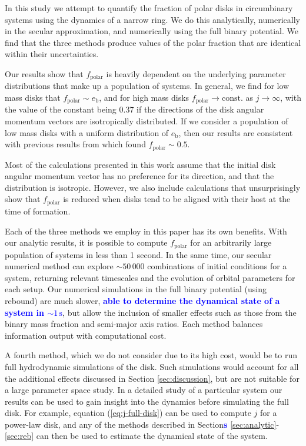 \documentclass[twocolumn,linenumbers]{aastex631}
\newcommand{\RR}[1]{\textcolor{blue}{\bf#1}} %
\begin{document}
In this study we attempt to quantify the fraction of polar disks in circumbinary systems using the dynamics of a narrow ring. We do this analytically, numerically in the secular approximation, and numerically using the full binary potential. We find that the three methods produce values of the polar fraction that are identical within their uncertainties.

Our results show that $f_\text{polar}$ is heavily dependent on the underlying parameter distributions that make up a population of systems. In general, we find for low mass disks that $f_\text{polar} \sim e_\text{b}$, and for high mass disks $f_\text{polar} \rightarrow \text{const.}$ as $j\rightarrow \infty$, with the value of the constant being 0.37 if the directions of the disk angular momentum vectors are isotropically distributed.
If we consider a population of low mass disks with a uniform distribution of $e_\text{b}$, then our results are consistent with previous results from \citet{ceppi2024} which found $f_\text{polar}\sim 0.5$. 

Most of the calculations presented in this work assume that the initial disk angular momentum vector has no preference for its direction, and that the distribution is isotropic. However, we also include calculations that unsurprisingly show that $f_\text{polar}$ is reduced when disks tend to be aligned with their host at the time of formation.

Each of the three methods we employ in this paper has its own benefits. With our analytic results, it is possible to compute $f_\text{polar}$ for an arbitrarily large population of systems in less than 1 second. In the same time, our secular numerical method can explore $\sim 50\,000$ combinations of initial conditions for a system, returning relevant timescales and the evolution of orbital parameters for each setup. Our numerical simulations in the full binary potential (using {\sc rebound}) are much slower, \RR{able to determine the dynamical state of a system in $\sim 1\,\text{s}$}, but allow the inclusion of smaller effects such as those from the binary mass fraction and semi-major axis ratios. Each method balances information output with computational cost.

A fourth method, which we do not consider due to its high cost, would be to run full hydrodynamic simulations of the disk. Such simulations would account for all the additional effects discussed in Section \ref{sec:discussion}, but are not suitable for a large parameter space study. In a detailed study of a particular system our results can be used to gain insight into the dynamics before simulating the full disk. For example, equation (\ref{eq:j-full-disk}) can be used to compute $j$ for a power-law disk, and any of the methods described in Section\RR{s} \ref{sec:analytic}-\ref{sec:reb} can then be used to estimate the dynamical state of the system.
\end{document}

